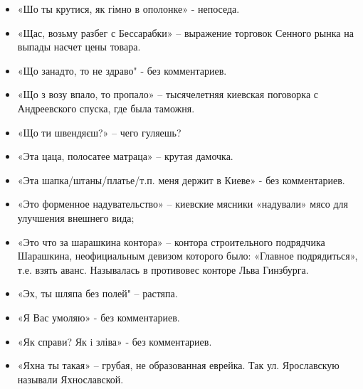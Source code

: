 \begin{itemize}
\item  «Шо ты крутися, як гімно в ополонке» - непоседа.
\item  «Щас, возьму разбег с Бессарабки» – выражение торговок Сенного рынка на выпады насчет цены товара.
\item  «Що занадто, то не здраво" - без комментариев.
\item  «Що з возу впало, то пропало» – тысячелетняя киевская поговорка с Андреевского спуска, где была таможня.
\item  «Що ти швендяєш?» – чего гуляешь?
\item  «Эта цаца, полосатее матраца» – крутая дамочка.
\item  «Эта шапка/штаны/платье/т.п. меня держит в Киеве» - без комментариев.
\item  «Это форменное надувательство» – киевские мясники «надували» мясо для улучшения внешнего вида;
\item  «Это что за шарашкина контора» – контора строительного подрядчика Шарашкина, неофициальным девизом которого было: «Главное подрядиться», т.е. взять аванс. Называлась в противовес конторе Льва Гинзбурга.
\item  «Эх, ты шляпа без полей" – растяпа.
\item  «Я Вас умоляю» - без комментариев.
\item  «Як справи? Як i зліва» - без комментариев.
\item  «Яхна ты такая» – грубая, не образованная еврейка. Так ул. Ярославскую называли Яхнославской.
\end{itemize}
